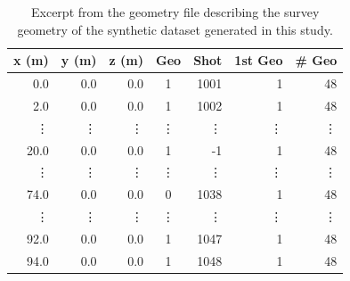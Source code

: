 \documentclass[a4paper,fleqn]{cas-sc}
\begin{document}
\begin{table}
   \caption{Excerpt from the geometry file describing the survey geometry of the synthetic dataset generated in this study.}
    \centering
    \begin{tabular}{rrrcrrr}
        \toprule
        \textbf{x (m)} & \textbf{y (m)} & \textbf{z (m)} & \textbf{Geo} & \textbf{Shot} & \textbf{1st Geo} & \textbf{\# Geo} \\
        \midrule
		0.0 & 0.0 & 0.0 & 1 & 1001 & 1 & 48 \\
		2.0 & 0.0 & 0.0 & 1 & 1002 & 1 & 48 \\
        \vdots & \vdots & \vdots & \vdots & \vdots & \vdots & \vdots \\
		20.0 & 0.0 & 0.0 & 1 & -1 & 1 & 48 \\
        \vdots & \vdots & \vdots & \vdots & \vdots & \vdots & \vdots \\
        74.0 & 0.0 & 0.0 & 0 & 1038 & 1 & 48 \\
        \vdots & \vdots & \vdots & \vdots & \vdots & \vdots & \vdots \\
		92.0 & 0.0 & 0.0 & 1 & 1047 & 1 & 48 \\
		94.0 & 0.0 & 0.0 & 1 & 1048 & 1 & 48 \\
        \bottomrule
    \end{tabular}
    \label{tab:syn_geometry}
\end{table}
\end{document}
